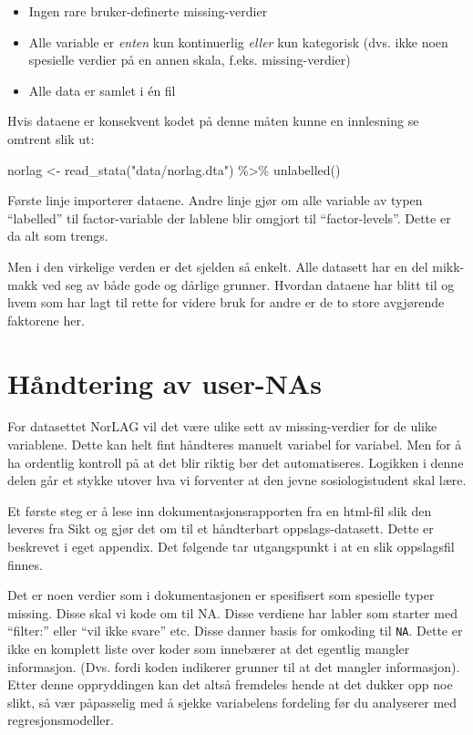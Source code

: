\documentclass[
  norsk,
  letterpaper,
  DIV=11,
  numbers=noendperiod]{scrreprt}
\newenvironment{Shaded}{\begin{snugshade}}{\end{snugshade}}
\newcommand{\FunctionTok}[1]{\textcolor[rgb]{0.28,0.35,0.67}{#1}}
\newcommand{\NormalTok}[1]{\textcolor[rgb]{0.00,0.23,0.31}{#1}}
\newcommand{\OtherTok}[1]{\textcolor[rgb]{0.00,0.23,0.31}{#1}}
\newcommand{\SpecialCharTok}[1]{\textcolor[rgb]{0.37,0.37,0.37}{#1}}
\newcommand{\StringTok}[1]{\textcolor[rgb]{0.13,0.47,0.30}{#1}}
\providecommand{\tightlist}{%
  \setlength{\itemsep}{0pt}\setlength{\parskip}{0pt}}
\theoremstyle{definition}
\theoremstyle{remark}
\begin{document}
\begin{itemize}
\tightlist
\item
  Ingen rare bruker-definerte missing-verdier
\item
  Alle variable er \emph{enten} kun kontinuerlig \emph{eller} kun
  kategorisk (dvs. ikke noen spesielle verdier på en annen skala, f.eks.
  missing-verdier)
\item
  Alle data er samlet i én fil
\end{itemize}

Hvis dataene er konsekvent kodet på denne måten kunne en innlesning se
omtrent slik ut:

\begin{Shaded}
\begin{Highlighting}[]
\NormalTok{norlag }\OtherTok{\textless{}{-}} \FunctionTok{read\_stata}\NormalTok{(}\StringTok{"data/norlag.dta"}\NormalTok{) }\SpecialCharTok{\%\textgreater{}\%} 
  \FunctionTok{unlabelled}\NormalTok{()}
\end{Highlighting}
\end{Shaded}

Første linje importerer dataene. Andre linje gjør om alle variable av
typen ``labelled'' til factor-variable der lablene blir omgjort til
``factor-levels''. Dette er da alt som trengs.

Men i den virkelige verden er det sjelden så enkelt. Alle datasett har
en del mikk-makk ved seg av både gode og dårlige grunner. Hvordan
dataene har blitt til og hvem som har lagt til rette for videre bruk for
andre er de to store avgjørende faktorene her.

\section{Håndtering av user-NAs}\label{huxe5ndtering-av-user-nas}

For datasettet NorLAG vil det være ulike sett av missing-verdier for de
ulike variablene. Dette kan helt fint håndteres manuelt variabel for
variabel. Men for å ha ordentlig kontroll på at det blir riktig bør det
automatiseres. Logikken i denne delen går et stykke utover hva vi
forventer at den jevne sosiologistudent skal lære.

Et første steg er å lese inn dokumentasjonsrapporten fra en html-fil
slik den leveres fra Sikt og gjør det om til et håndterbart
oppslags-datasett. Dette er beskrevet i eget appendix. Det følgende tar
utgangspunkt i at en slik oppslagsfil finnes.

Det er noen verdier som i dokumentasjonen er spesifisert som spesielle
typer missing. Disse skal vi kode om til NA. Disse verdiene har labler
som starter med ``filter:'' eller ``vil ikke svare'' etc. Disse danner
basis for omkoding til \texttt{NA}. Dette er ikke en komplett liste over
koder som innebærer at det egentlig mangler informasjon. (Dvs. fordi
koden indikerer grunner til at det mangler informasjon). Etter denne
oppryddingen kan det altså fremdeles hende at det dukker opp noe slikt,
så vær påpasselig med å sjekke variabelens fordeling før du analyserer
med regresjonsmodeller.
\end{document}
